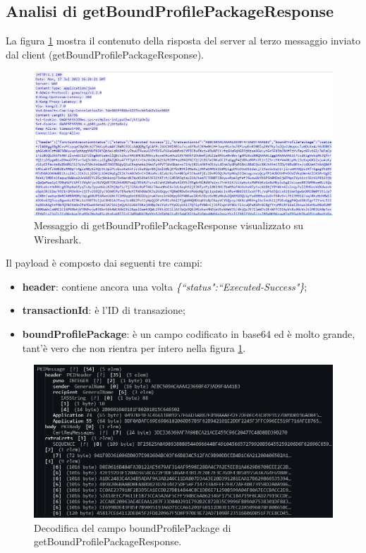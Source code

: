 \documentclass[10pt, oneside]{book}
\begin{document}
\subsection{Analisi di getBoundProfilePackageResponse}
La figura \ref{fig:msg6-stream-pcap} mostra il contenuto della risposta del server al terzo messaggio inviato dal client (getBoundProfilePackageResponse).\\
\begin{figure}
\includegraphics[width=\linewidth]{msg6-stream-pcap.png}
\caption{Messaggio di getBoundProfilePackageResponse visualizzato su Wireshark.}
\label{fig:msg6-stream-pcap}
\end{figure}
Il payload è composto dai seguenti tre campi:
\begin{itemize}
\item \textbf{header}: contiene ancora una volta \textit{\{``status":``Executed-Success"\}};
\item \textbf{transactionId}: è l'ID di transazione;
\item \textbf{boundProfilePackage}: è un campo codificato in base64 ed è molto grande, tant'è vero che non rientra per intero nella figura \ref{fig:msg6-stream-pcap}.
\end{itemize}
\begin{figure}
\includegraphics[width=\linewidth]{decode-boundProfilePackage.png}
\caption{Decodifica del campo boundProfilePackage di getBoundProfilePackageResponse.}
\label{fig:decode-boundProfilePackage}
\end{figure}
\end{document}
